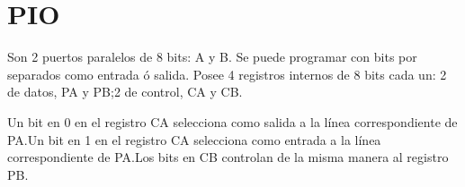 \section{PIO}

Son 2 puertos paralelos de 8 bits: A y B. Se puede programar con bits por separados como entrada ó salida. Posee 4 registros internos de 8 bits cada un: 2 de datos, PA y PB;\@ 2 de control, CA y CB.\@ 

Un bit en 0 en el registro CA selecciona como salida a la línea correspondiente de PA.\@ Un bit en 1 en el registro CA selecciona como entrada a la línea correspondiente de PA.\@ Los bits en CB controlan de la misma manera al registro PB.\@